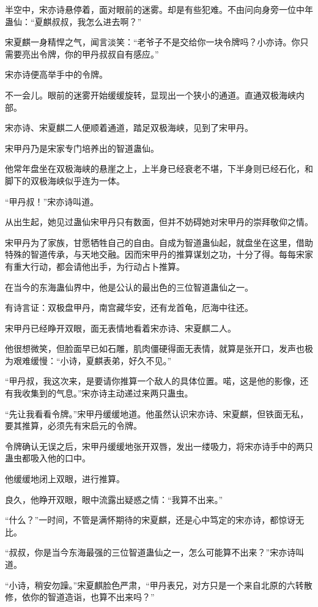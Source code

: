 \begin{this_body}
半空中，宋亦诗悬停着，面对眼前的迷雾。却是有些犯难。不由问向身旁一位中年蛊仙：“夏麒叔叔，我怎么进去啊？”

宋夏麒一身精悍之气，闻言淡笑：“老爷子不是交给你一块令牌吗？小亦诗。你只需要亮出令牌，你的甲丹叔叔自有感应。”

宋亦诗便高举手中的令牌。

不一会儿。眼前的迷雾开始缓缓旋转，显现出一个狭小的通道。直通双极海峡内部。

宋亦诗、宋夏麒二人便顺着通道，踏足双极海峡，见到了宋甲丹。

宋甲丹乃是宋家专门培养出的智道蛊仙。

他常年盘坐在双极海峡的悬崖之上，上半身已经衰老不堪，下半身则已经石化，和脚下的双极海峡似乎连为一体。

“甲丹叔！”宋亦诗叫道。

从出生起，她见过蛊仙宋甲丹只有数面，但并不妨碍她对宋甲丹的崇拜敬仰之情。

宋甲丹为了家族，甘愿牺牲自己的自由。自成为智道蛊仙起，就盘坐在这里，借助特殊的智道传承，与天地交融。因而宋甲丹的推算谋划之功，十分了得。每每宋家有重大行动，都会请他出手，为行动占卜推算。

在当今的东海蛊仙界中，他是公认的最出色的三位智道蛊仙之一。

有诗言证：双极盘甲丹，南宫藏华安，还有龙首龟，厄海中往还。

宋甲丹已经睁开双眼，面无表情地看着宋亦诗、宋夏麒二人。

他很想微笑，但脸面早已如石雕，肌肉僵硬得面无表情，就算是张开口，发声也极为艰难缓慢：“小诗，夏麒表弟，好久不见。”

“甲丹叔，我这次来，是要请你推算一个敌人的具体位置。喏，这是他的影像，还有我收集到的气息。”宋亦诗主动递过来两只蛊虫。

“先让我看看令牌。”宋甲丹缓缓地道。他虽然认识宋亦诗、宋夏麒，但铁面无私，要其推算，必须先有宋启元的令牌。

令牌确认无误之后，宋甲丹缓缓地张开双唇，发出一缕吸力，将宋亦诗手中的两只蛊虫都吸入他的口中。

他缓缓地闭上双眼，进行推算。

良久，他睁开双眼，眼中流露出疑惑之情：“我算不出来。”

“什么？”一时间，不管是满怀期待的宋夏麒，还是心中笃定的宋亦诗，都惊讶无比。

“叔叔，你是当今东海最强的三位智道蛊仙之一，怎么可能算不出来？”宋亦诗叫道。

“小诗，稍安勿躁。”宋夏麒脸色严肃，“甲丹表兄，对方只是一个来自北原的六转散修，依你的智道造诣，也算不出来吗？”


\end{this_body}
